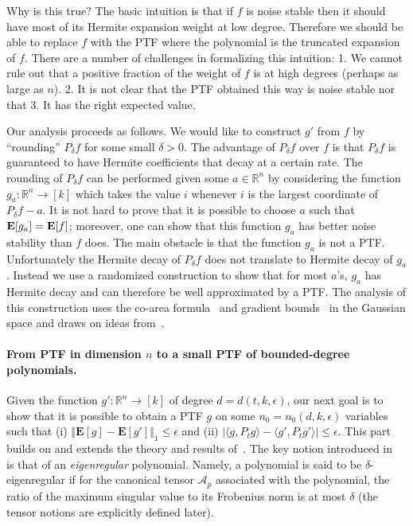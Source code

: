 \documentclass[11pt]{article}
\numberwithin{equation}{section}
\theoremstyle{definition}
\theoremstyle{plain}
\newcommand{\E}{{\bf E}}
\begin{document}
Why is this true? The basic intuition is that if $f$ is noise stable then it should have most of its Hermite expansion weight at low degree. 
Therefore we should be able to replace $f$ with the PTF where the polynomial is the truncated expansion of $f$. 
There are a number of challenges in formalizing this intuition: 1. We cannot rule out that a positive fraction of the weight of $f$ is at high degrees (perhaps as large as $n$).
2. It is not clear that the PTF obtained this way is noise stable nor that 3. It has the right expected value. 

Our analysis proceeds as follows. We would like to construct $g'$ from $f$ by ``rounding''
$P_\delta f$ for some small $\delta>0$. The advantage of $P_\delta f$ over $f$ is that $P_\delta f$ is guaranteed to have Hermite coefficients that decay at a certain rate.
The rounding of $P_\delta f$ can be performed given some $a \in \mathbb{R}^n$ by considering the function
$g_a: \mathbb{R}^n \to [k]$ which takes the value $i$ whenever $i$ is the largest
coordinate of $P_\delta f - a$. It is not hard to prove that it is possible to choose $a$ such
that $\E[g_a] = \E[f]$; moreover, one can show that this function $g_a$ has better noise
stability than $f$ does. The main obstacle is that the function $g_a$ is not a PTF\@. 
Unfortunately the Hermite decay of $P_\delta f$ does not translate to Hermite decay of $g_a$. 
Instead we use a randomized construction to show that for most $a$'s, $g_a$ has
Hermite decay and can therefore be well approximated by a PTF\@. The
analysis of this construction uses the co-area formula~\cite{federer1969} and gradient
bounds~\cite{Ledoux:94} in the Gaussian space  and draws on ideas from~\cite{Neeman14, KNOW14}.


\paragraph{From PTF in dimension $n$ to a small PTF of
%
bounded-degree    %
polynomials.}   

Given the function $g': \mathbb{R}^n \rightarrow [k]$ of degree $d= d( t, k, \epsilon)$, our next goal is to show  that it is possible to obtain a PTF $g$ on some $n_0 = n_0 (d, k, \epsilon)$ variables such that (i) $\Vert \mathbf{E}[g] - \mathbf{E}[g'] \Vert_1 \le \epsilon$ and (ii) $|\langle g, P_t g \rangle - \langle g', P_t g' \rangle| \le \epsilon$. This part builds on and extends the theory and results of~\cite{DS14}. The key notion introduced in~\cite{DS14} is that of an \emph{eigenregular} polynomial. Namely, a polynomial is said to be $\delta$-eigenregular if for the canonical tensor $\mathcal{A}_p$ associated with the polynomial, the ratio of  the maximum singular value to its Frobenius norm is at most $\delta$ (the tensor notions are explicitly defined later). 
\end{document}
